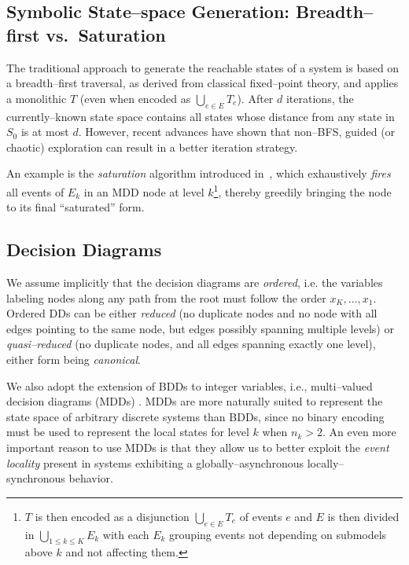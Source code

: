 \documentclass[a4paper,oneside,11pt,pdftex]{llncs}
\begin{document}
\subsection{Symbolic State--space Generation: Breadth--first vs.\ Saturation}

The traditional approach to generate the reachable states of
a system is based on a breadth--first traversal, as derived from
classical fixed--point theory, and applies a monolithic $T$
(even when encoded as $\bigcup_{e\in E}T_e$).
After $d$ iterations, the currently--known state space contains
all states whose distance from any state in $S_0$ is at most $d$.
However, recent advances have shown that non--BFS, guided (or chaotic)
exploration can result in a better iteration strategy.

An example is the \emph{saturation} algorithm introduced 
in~\cite{Saturation2001}, which exhaustively \emph{fires} all events of 
$ E_k$ in an MDD node at level $k$\footnote{$T$ is then encoded as a 
disjunction $\bigcup_{e\in E}T_e$ of events $e$ and $E$ is then divided 
in $\bigcup_{1 \leq k \leq K}E_k$ with each $E_k$ grouping events not 
depending on submodels above $k$ and not affecting them.}, thereby 
greedily bringing the node to its final ``saturated'' form.

\subsection{Decision Diagrams}

We assume implicitly that the decision diagrams are \emph{ordered},
i.e. the variables labeling nodes along any path from the root must follow
the order $x_K, \ldots, x_1$.
Ordered DDs can be either \emph{reduced} (no duplicate nodes and no node with all
edges pointing to the same node, but edges possibly spanning
multiple levels) or \emph{quasi--reduced} (no duplicate nodes, and all
edges spanning exactly one level), either form being \emph{canonical}.

We also adopt the extension of BDDs to integer variables, i.e., 
multi--valued decision diagrams (MDDs) \cite{Kam1998}. MDDs are more 
naturally suited to represent the state space of arbitrary discrete 
systems than BDDs, since no binary encoding must be used to represent 
the local states for level $k$ when $n_k > 2$. An even more important 
reason to use MDDs is that they allow us to better exploit the 
\emph{event locality} present in systems exhibiting a 
globally--asynchronous locally--synchronous behavior.
\end{document}
